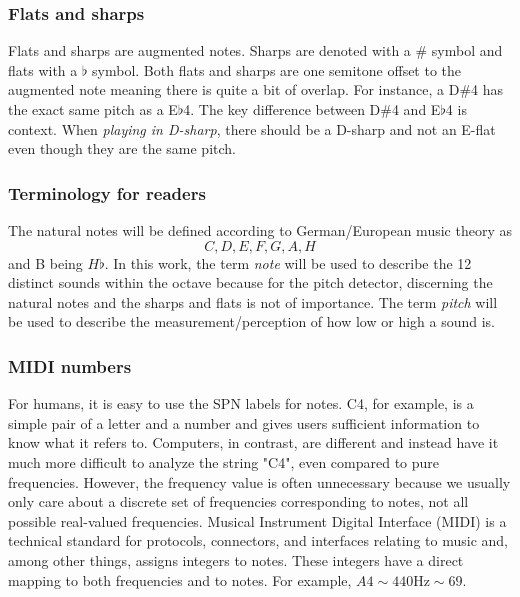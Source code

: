 \subsubsection{Flats and sharps}
Flats and sharps are augmented notes. Sharps are denoted with a $\#$ symbol and flats with a $\flat$ symbol. Both flats and sharps are one semitone offset to the augmented note meaning there is quite a bit of overlap. For instance, a D$\#$4 has the exact same pitch as a E$\flat$4. The key difference between D$\#$4 and E$\flat$4 is context. When \textit{playing in D-sharp}, there should be a D-sharp and not an E-flat even though they are the same pitch.

\subsubsection{Terminology for readers}
The natural notes will be defined according to German/European music theory as \[C, D, E, F, G, A, H\] and B being $H\flat$. In this work, the term \textit{note} will be used to describe the 12 distinct sounds within the octave because for the pitch detector, discerning the natural notes and the sharps and flats is not of importance. The term \textit{pitch} will be used to describe the measurement/perception of how low or high a sound is.

\subsubsection{MIDI numbers}
For humans, it is easy to use the SPN labels for notes. C4, for example, is a simple pair of a letter and a number and gives users sufficient information to know what it refers to. Computers, in contrast, are different and instead have it much more difficult to analyze the string "C4", even compared to pure frequencies. However, the frequency value is often unnecessary because we usually only care about a discrete set of frequencies corresponding to notes, not all possible real-valued frequencies. Musical Instrument Digital Interface (MIDI) is a technical standard for protocols, connectors, and interfaces relating to music and, among other things, assigns integers to notes. These integers have a direct mapping to both frequencies and to notes. For example, $A4 \sim 440\mathrm{Hz} \sim 69$.


% 

